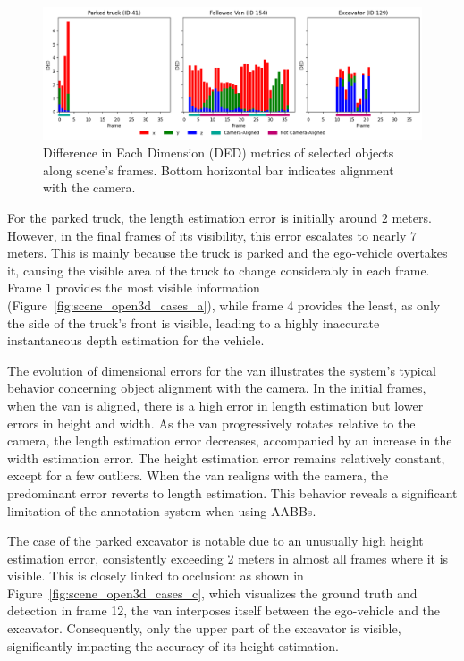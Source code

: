 \begin{figure}[h!]
    \centering
    \includegraphics[width=\linewidth]{./images/experiments/ded_selected_objects.png}
    \caption{Difference in Each Dimension (DED) metrics of selected objects along scene's frames. Bottom horizontal bar indicates alignment with the camera.}
    \label{fig:scene_ded_cases}
\end{figure}

For the parked truck, the length estimation error is initially around $2$ meters. However, in the final frames of its visibility, this error escalates to nearly $7$ meters. This is mainly because the truck is parked and the ego-vehicle overtakes it, causing the visible area of the truck to change considerably in each frame. Frame $1$ provides the most visible information (Figure~\ref{fig:scene_open3d_cases_a}), while frame $4$ provides the least, as only the side of the truck's front is visible, leading to a highly inaccurate instantaneous depth estimation for the vehicle.

The evolution of dimensional errors for the van illustrates the system's typical behavior concerning object alignment with the camera. In the initial frames, when the van is aligned, there is a high error in length estimation but lower errors in height and width. As the van progressively rotates relative to the camera, the length estimation error decreases, accompanied by an increase in the width estimation error. The height estimation error remains relatively constant, except for a few outliers. When the van realigns with the camera, the predominant error reverts to length estimation. This behavior reveals a significant limitation of the annotation system when using \acp{AABB}.

The case of the parked excavator is notable due to an unusually high height estimation error, consistently exceeding 2 meters in almost all frames where it is visible. This is closely linked to occlusion: as shown in Figure~\ref{fig:scene_open3d_cases_c}, which visualizes the ground truth and detection in frame 12, the van interposes itself between the ego-vehicle and the excavator. Consequently, only the upper part of the excavator is visible, significantly impacting the accuracy of its height estimation.

